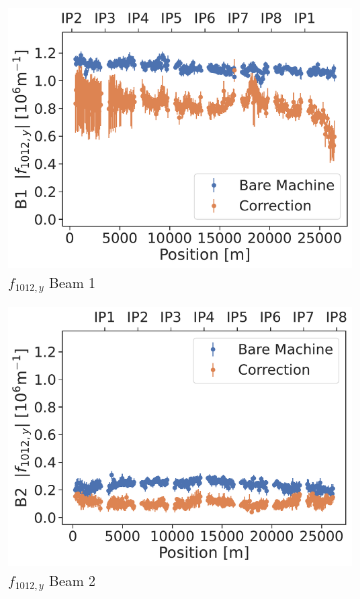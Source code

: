 \begin{figure}[!htb]
    \centering
    \begin{subfigure}{0.47\textwidth}
        \includegraphics[width=\textwidth]{./images/f1012_b1.pdf}
        \caption{$f_{1012,y}$ Beam 1}
    \end{subfigure}
    \hfill
    \begin{subfigure}{0.47\textwidth}
        \includegraphics[width=\textwidth]{./images/f1012_b2.pdf}
        \caption{$f_{1012,y}$ Beam 2}
    \end{subfigure}
    \par\bigskip 
    \begin{subfigure}{0.47\textwidth}

\end{subfigure}
\end{figure}
